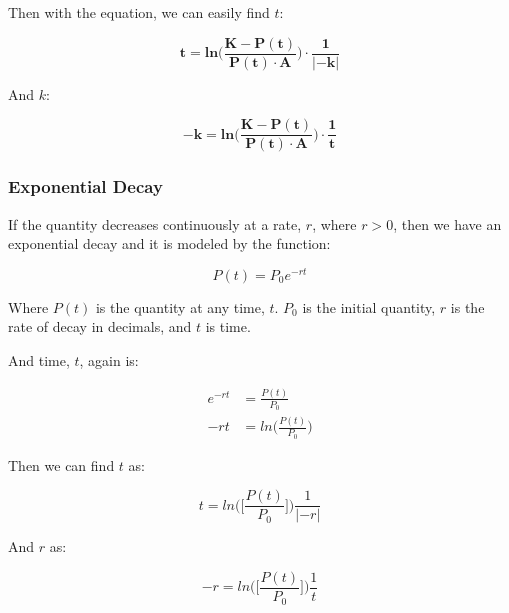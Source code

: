 \documentclass[12pt, UTF8]{article}
\begin{document}
	Then with the equation, we can easily find $t$:
	
	\begin{equation}
		\boldsymbol{t} = \boldsymbol{ln\bigg(\frac{K - P(t)}{P(t) \cdot A}\bigg) \cdot \frac{1}{|-k|}}
	\end{equation}
	
	And $k$:
	
	\begin{equation}
		\boldsymbol{-k} = \boldsymbol{ln\bigg(\frac{K - P(t)}{P(t) \cdot A}\bigg) \cdot \frac{1}{t}}
	\end{equation}
	
	\subsubsection*{Exponential Decay}
	
	If the quantity decreases continuously at a rate, $r$, where $r > 0$, then we have an exponential decay and it is modeled by the function:
	
	\begin{equation}
		P(t) = P_{0} e^{-rt}
	\end{equation}
	
	Where $P(t)$ is the quantity at any time, $t$. $P_{0}$ is the initial quantity, $r$ is the rate of decay in decimals, and $t$ is time.
	
	And time, $t$, again is:
	
	\begin{align}
		e^{-rt} &= \frac{P(t)}{P_{0}}  \nonumber \\
		-rt &= ln\bigg(\frac{P(t)}{P_{0}}\bigg)  \nonumber 
	\end{align}
	
	Then we can find $t$ as:
	
	\begin{equation}
		t = ln\bigg(\bigg[\frac{P(t)}{P_{0}}\bigg]\bigg) \frac{1}{|-r|}
	\end{equation}
	
	And $r$ as:
	
	\begin{equation}
		-r = ln\bigg(\bigg[\frac{P(t)}{P_{0}}\bigg]\bigg) \frac{1}{t}
	\end{equation}
\end{document}
